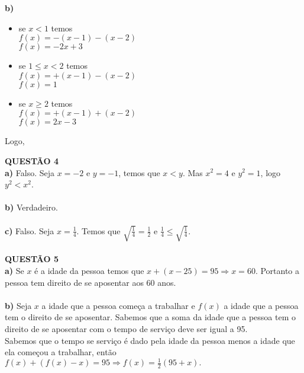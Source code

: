 \documentclass[12pt]{article}
\begin{document}
\textbf{ b) } 
\begin{itemize}
\item se $x<1$ temos\\
$f(x)=-(x-1)-(x-2)$\\
$f(x)=-2x+3$\\
\item se $1\leq x<2$ temos\\
$f(x)=+(x-1)-(x-2)$\\
$f(x)=1$
\item se $x\geq2$ temos\\
$f(x)=+(x-1)+(x-2)$\\
$f(x)=2x-3$\\
\end{itemize}
Logo,\\

\begin{comment}
$
f(x) = \left\{
\begin{array}{rcl}
-2x+31,& \mbox{se} & x<1\\
1, & \mbox{se} & 1\leqx<2\\
2x-3, & \mbox{se} & x\geq 2
\end{array}
\right.
$\\
\end{comment}


\textbf{ QUESTÃO 4}\\

\textbf{a)} Falso. Seja $x=-2$ e $y=-1$, temos que $x<y$. Mas $x^2=4$ e $y^2=1$, logo $y^2<x^2$.\\
\\
\textbf{b)} Verdadeiro.\\
\\
\textbf{c)} Falso. Seja $x=\frac{1}{4}$. Temos que $\sqrt{\frac{1}{4}}=\frac{1}{2}$ e $\frac{1}{4}\leq\sqrt{\frac{1}{4}}$.
\\
\\

\textbf{QUESTÃO 5}\\

\textbf{a)} Se $x$ é a idade da pessoa temos que $x+(x-25)=95\Rightarrow x=60$. Portanto a pessoa tem direito de se aposentar aos $60$ anos.\\
\\
\textbf{ b) } Seja $x$ a idade que a pessoa começa a trabalhar e $f(x)$ a idade que a pessoa tem o direito de se aposentar. Sabemos que a soma da idade que a pessoa tem o direito de se aposentar com o tempo de serviço deve ser igual a 95.\\
Sabemos que o tempo se serviço é dado pela idade da pessoa menos a idade que ela começou a trabalhar, então $f(x)+(f(x)-x)=95\Rightarrow f(x)=\frac{1}{2}(95+x).$
\end{document}
